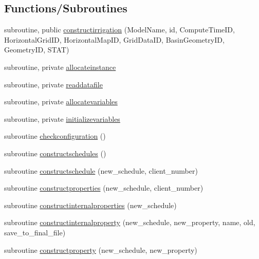 \subsection*{Functions/\+Subroutines}
\begin{DoxyCompactItemize}
\item 
subroutine, public \mbox{\hyperlink{namespacemoduleirrigation_a1533651367025ce2df52f548e83ecf32}{constructirrigation}} (Model\+Name, id, Compute\+Time\+ID, Horizontal\+Grid\+ID, Horizontal\+Map\+ID, Grid\+Data\+ID, Basin\+Geometry\+ID, Geometry\+ID, S\+T\+AT)
\item 
subroutine, private \mbox{\hyperlink{namespacemoduleirrigation_abf07b20393874412d5ace40cf035088a}{allocateinstance}}
\item 
subroutine, private \mbox{\hyperlink{namespacemoduleirrigation_ae53033583e6896d868b4b65aa406c69f}{readdatafile}}
\item 
subroutine, private \mbox{\hyperlink{namespacemoduleirrigation_af29d54feea0c7cea86e11b179c4a36a3}{allocatevariables}}
\item 
subroutine, private \mbox{\hyperlink{namespacemoduleirrigation_ae48537ba7c81436db04d271739290617}{initializevariables}}
\item 
subroutine \mbox{\hyperlink{namespacemoduleirrigation_aa85b5fec6716d256db1e856f29f36468}{checkconfiguration}} ()
\item 
subroutine \mbox{\hyperlink{namespacemoduleirrigation_a6339c6a7568266fb2911688be44e1957}{constructschedules}} ()
\item 
subroutine \mbox{\hyperlink{namespacemoduleirrigation_a46de92ffaac8fbd782bdcdf682a48601}{constructschedule}} (new\+\_\+schedule, client\+\_\+number)
\item 
subroutine \mbox{\hyperlink{namespacemoduleirrigation_a3c38f9eb6c59407d288913caba5f6569}{constructproperties}} (new\+\_\+schedule, client\+\_\+number)
\item 
subroutine \mbox{\hyperlink{namespacemoduleirrigation_ab5de3f1600faba7f4c6ae843ce15e5e3}{constructinternalproperties}} (new\+\_\+schedule)
\item 
subroutine \mbox{\hyperlink{namespacemoduleirrigation_ae801aa6c2bc91136e80b57fea94668d1}{constructinternalproperty}} (new\+\_\+schedule, new\+\_\+property, name, old, save\+\_\+to\+\_\+final\+\_\+file)
\item 
subroutine \mbox{\hyperlink{namespacemoduleirrigation_a777c0e9f94d23db57aa011c352cc06d9}{constructproperty}} (new\+\_\+schedule, new\+\_\+property)
\item 

\end{DoxyCompactItemize}
